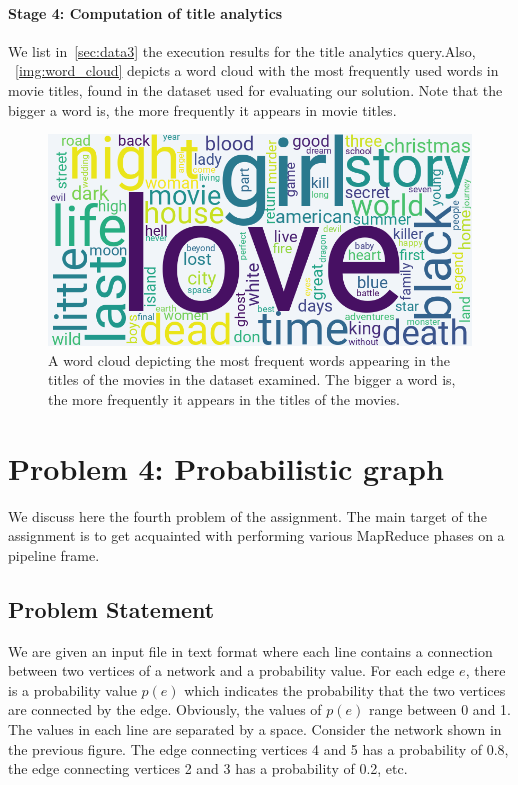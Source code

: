 \documentclass[acmlarge]{acmart}
\begin{document}
\paragraph{Stage 4: Computation of title analytics}
We list in~\autoref{sec:data3} the execution results for the title analytics query.Also, ~\autoref{img:word_cloud} depicts a word cloud with the most frequently used words in movie titles, found in the dataset used for evaluating our solution. Note that the bigger a word is, the more frequently it appears in movie titles.
\begin{figure}[tb!]
  \centering
  \includegraphics[width=0.8\linewidth]{figures/word cloud}
  \caption{A word cloud depicting the most frequent words appearing in the titles of the movies in the dataset examined. The bigger a word is, the more frequently it appears in the titles of the movies.}
  \label{img:word_cloud}
\end{figure}

\section{Problem 4: Probabilistic graph}
\label{sec:problem4}
We discuss here the fourth problem of the assignment.
The main target of the assignment is to get acquainted with performing various MapReduce phases on a pipeline frame.

\subsection{Problem Statement}
We are given an input file in text format where each line contains a connection between two vertices of a network and a
probability value.
For each edge \( e \), there is a probability value \( p(e) \) which indicates the probability that the two vertices are
connected by the edge.
Obviously, the values of \( p(e) \) range between 0 and 1.
The values in each line are separated by a space.
Consider the network shown in the previous figure.
The edge connecting vertices 4 and 5 has a probability of
0.8, the edge connecting vertices 2 and 3 has a probability of 0.2, etc.
\end{document}
